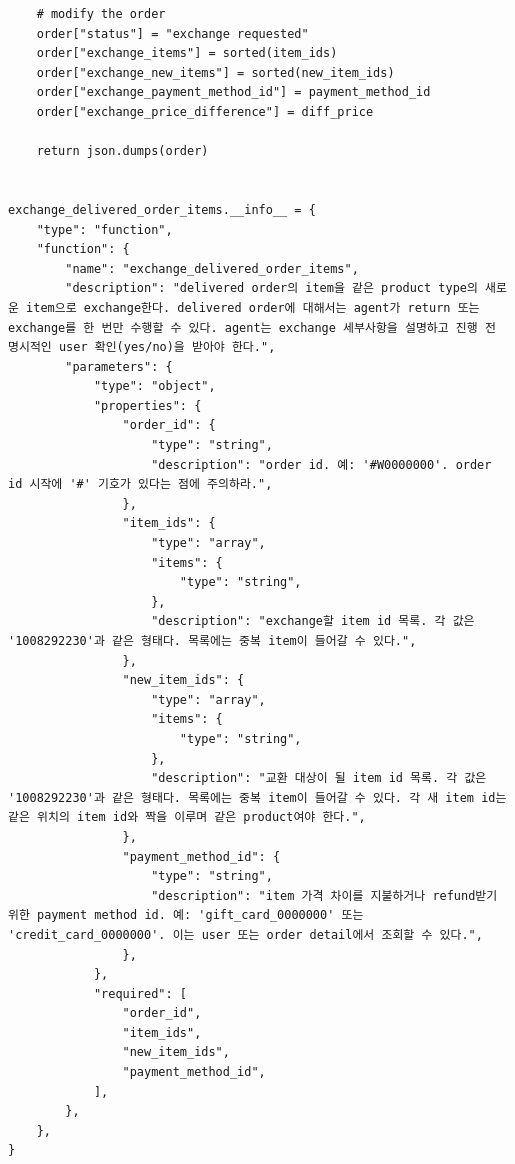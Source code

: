 \begin{verbatim}
    # modify the order
    order["status"] = "exchange requested"
    order["exchange_items"] = sorted(item_ids)
    order["exchange_new_items"] = sorted(new_item_ids)
    order["exchange_payment_method_id"] = payment_method_id
    order["exchange_price_difference"] = diff_price

    return json.dumps(order)


exchange_delivered_order_items.__info__ = {
    "type": "function",
    "function": {
        "name": "exchange_delivered_order_items",
        "description": "delivered order의 item을 같은 product type의 새로운 item으로 exchange한다. delivered order에 대해서는 agent가 return 또는 exchange를 한 번만 수행할 수 있다. agent는 exchange 세부사항을 설명하고 진행 전 명시적인 user 확인(yes/no)을 받아야 한다.",
        "parameters": {
            "type": "object",
            "properties": {
                "order_id": {
                    "type": "string",
                    "description": "order id. 예: '#W0000000'. order id 시작에 '#' 기호가 있다는 점에 주의하라.",
                },
                "item_ids": {
                    "type": "array",
                    "items": {
                        "type": "string",
                    },
                    "description": "exchange할 item id 목록. 각 값은 '1008292230'과 같은 형태다. 목록에는 중복 item이 들어갈 수 있다.",
                },
                "new_item_ids": {
                    "type": "array",
                    "items": {
                        "type": "string",
                    },
                    "description": "교환 대상이 될 item id 목록. 각 값은 '1008292230'과 같은 형태다. 목록에는 중복 item이 들어갈 수 있다. 각 새 item id는 같은 위치의 item id와 짝을 이루며 같은 product여야 한다.",
                },
                "payment_method_id": {
                    "type": "string",
                    "description": "item 가격 차이를 지불하거나 refund받기 위한 payment method id. 예: 'gift_card_0000000' 또는 'credit_card_0000000'. 이는 user 또는 order detail에서 조회할 수 있다.",
                },
            },
            "required": [
                "order_id",
                "item_ids",
                "new_item_ids",
                "payment_method_id",
            ],
        },
    },
}
\end{verbatim}

